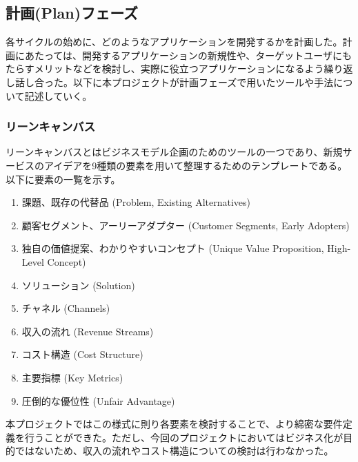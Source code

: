 \subsection{計画(Plan)フェーズ}
各サイクルの始めに、どのようなアプリケーションを開発するかを計画した。計画にあたっては、開発するアプリケーションの新規性や、ターゲットユーザにもたらすメリットなどを検討し、実際に役立つアプリケーションになるよう繰り返し話し合った。以下に本プロジェクトが計画フェーズで用いたツールや手法について記述していく。
\subsubsection{リーンキャンバス}
リーンキャンバスとはビジネスモデル企画のためのツールの一つであり、新規サービスのアイデアを9種類の要素を用いて整理するためのテンプレートである。以下に要素の一覧を示す。
\begin{enumerate}
\item 課題、既存の代替品 (Problem, Existing Alternatives)
\item 顧客セグメント、アーリーアダプター (Customer Segments, Early Adopters)
\item 独自の価値提案、わかりやすいコンセプト (Unique Value Proposition, High-Level Concept)
\item ソリューション (Solution)
\item チャネル (Channels)
\item 収入の流れ (Revenue Streams)
\item コスト構造 (Cost Structure)
\item 主要指標 (Key Metrics)
\item 圧倒的な優位性 (Unfair Advantage)
\end{enumerate}
本プロジェクトではこの様式に則り各要素を検討することで、より綿密な要件定義を行うことができた。ただし、今回のプロジェクトにおいてはビジネス化が目的ではないため、収入の流れやコスト構造についての検討は行わなかった。
